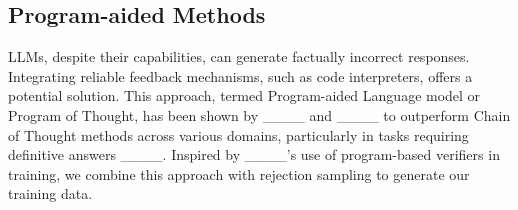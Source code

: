 \subsection{Program-aided Methods}
LLMs, despite their capabilities, can generate factually incorrect responses. Integrating reliable feedback mechanisms, such as code interpreters, offers a potential solution. This approach, termed Program-aided Language model or Program of Thought, has been shown by ____ and ____ to outperform Chain of Thought methods across various domains, particularly in tasks requiring definitive answers ____. Inspired by ____'s use of program-based verifiers in training, we combine this approach with rejection sampling to generate our training data.